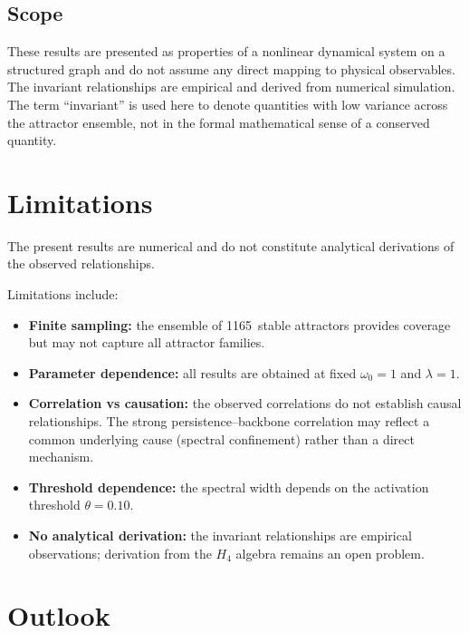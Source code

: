 \documentclass[12pt,a4paper]{article}
\newcommand{\Hfour}{H_4}
\begin{document}
\subsection{Scope}

These results are presented as properties of a nonlinear dynamical
system on a structured graph and do not assume any direct mapping to
physical observables.  The invariant relationships are empirical and
derived from numerical simulation.  The term ``invariant'' is used
here to denote quantities with low variance across the attractor
ensemble, not in the formal mathematical sense of a conserved
quantity.


\section{Limitations}\label{sec:limitations}

The present results are numerical and do not constitute analytical
derivations of the observed relationships.

Limitations include:
\begin{itemize}[nosep]
\item \textbf{Finite sampling:} the ensemble of 1165~stable
  attractors provides coverage but may not capture all attractor
  families.
\item \textbf{Parameter dependence:} all results are obtained at
  fixed $\omega_0 = 1$ and $\lambda = 1$.
\item \textbf{Correlation vs causation:} the observed correlations
  do not establish causal relationships.  The strong
  persistence--backbone correlation may reflect a common underlying
  cause (spectral confinement) rather than a direct mechanism.
\item \textbf{Threshold dependence:} the spectral width depends on
  the activation threshold $\theta = 0.10$.
\item \textbf{No analytical derivation:} the invariant relationships
  are empirical observations; derivation from the $\Hfour$ algebra
  remains an open problem.
\end{itemize}


\section{Outlook}\label{sec:outlook}
\end{document}
